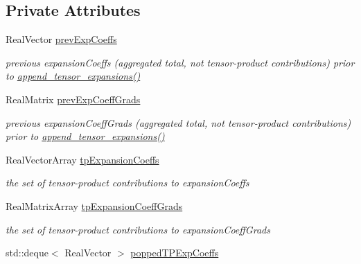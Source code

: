 \subsection*{Private Attributes}
\begin{DoxyCompactItemize}
\item 
Real\+Vector \hyperlink{classPecos_1_1ProjectOrthogPolyApproximation_a1faf1c22abf8e2e00ec23047a3561504}{prev\+Exp\+Coeffs}\label{classPecos_1_1ProjectOrthogPolyApproximation_a1faf1c22abf8e2e00ec23047a3561504}

\begin{DoxyCompactList}\small\item\em previous expansion\+Coeffs (aggregated total, not tensor-\/product contributions) prior to \hyperlink{classPecos_1_1ProjectOrthogPolyApproximation_a284a7cf7352dcc2efef9aed24ea4c654}{append\+\_\+tensor\+\_\+expansions()} \end{DoxyCompactList}\item 
Real\+Matrix \hyperlink{classPecos_1_1ProjectOrthogPolyApproximation_af0ebc5c5c5d1da634d1025fd0c4ad534}{prev\+Exp\+Coeff\+Grads}\label{classPecos_1_1ProjectOrthogPolyApproximation_af0ebc5c5c5d1da634d1025fd0c4ad534}

\begin{DoxyCompactList}\small\item\em previous expansion\+Coeff\+Grads (aggregated total, not tensor-\/product contributions) prior to \hyperlink{classPecos_1_1ProjectOrthogPolyApproximation_a284a7cf7352dcc2efef9aed24ea4c654}{append\+\_\+tensor\+\_\+expansions()} \end{DoxyCompactList}\item 
Real\+Vector\+Array \hyperlink{classPecos_1_1ProjectOrthogPolyApproximation_a5257b357e1cbe2bc036541a357a01352}{tp\+Expansion\+Coeffs}\label{classPecos_1_1ProjectOrthogPolyApproximation_a5257b357e1cbe2bc036541a357a01352}

\begin{DoxyCompactList}\small\item\em the set of tensor-\/product contributions to expansion\+Coeffs \end{DoxyCompactList}\item 
Real\+Matrix\+Array \hyperlink{classPecos_1_1ProjectOrthogPolyApproximation_acc8697cb313aac233293874619c0eda7}{tp\+Expansion\+Coeff\+Grads}\label{classPecos_1_1ProjectOrthogPolyApproximation_acc8697cb313aac233293874619c0eda7}

\begin{DoxyCompactList}\small\item\em the set of tensor-\/product contributions to expansion\+Coeff\+Grads \end{DoxyCompactList}\item 
std\+::deque$<$ Real\+Vector $>$ \hyperlink{classPecos_1_1ProjectOrthogPolyApproximation_a252c0b8bb4226755ad14864be1bbc7e2}{popped\+T\+P\+Exp\+Coeffs}\label{classPecos_1_1ProjectOrthogPolyApproximation_a252c0b8bb4226755ad14864be1bbc7e2}


\end{DoxyCompactItemize}
